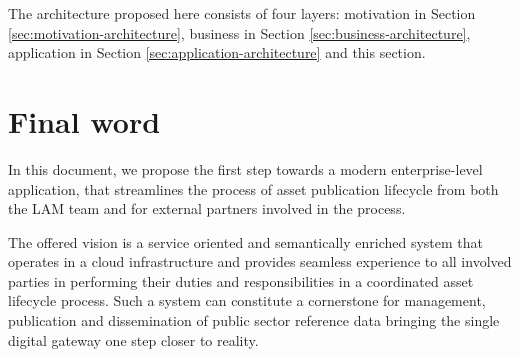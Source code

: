 	The architecture proposed here consists of four layers: motivation in Section \ref{sec:motivation-architecture}, business in Section \ref{sec:business-architecture}, application in Section \ref{sec:application-architecture} and this section.
	
    \section{Final word}
    
    In this document, we propose the first step towards a modern enterprise-level application, that streamlines the process of asset publication lifecycle from both the LAM team and for external partners involved in the process. 
    
    The offered vision is a service oriented and semantically enriched system that operates in a cloud infrastructure and provides seamless experience to all involved parties in performing their duties and responsibilities in a  coordinated asset lifecycle process. Such a system can constitute a cornerstone for management, publication and dissemination of public sector reference data bringing the single digital gateway one step closer to reality.